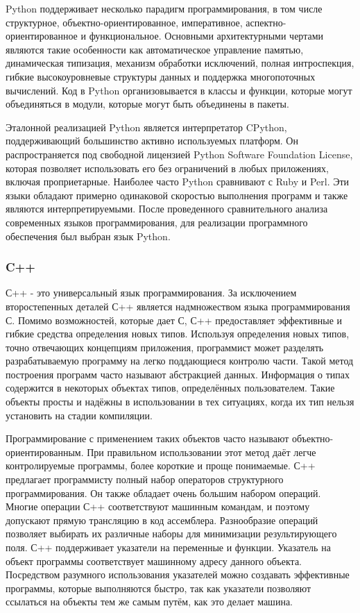 Python поддерживает несколько парадигм программирования, в том числе структурное, объектно-ориентированное, императивное, аспектно-ориентированное и функциональное. 
Основными архитектурными чертами являются такие особенности как автоматическое управление памятью, динамическая
типизация, механизм обработки исключений, полная интроспекция, гибкие высокоуровневые структуры данных и поддержка многопоточных вычислений. 
Код в Python организовывается в классы и функции, которые могут объединяться в модули, которые могут быть объединены в пакеты. 

Эталонной реализацией Python является интерпретатор CPython, поддерживающий большинство активно используемых платформ. Он распространяется под свободной лицензией Python Software Foundation License, которая
позволяет использовать его без ограничений в любых приложениях, включая проприетарные. 
Наиболее часто Python сравнивают с Ruby и Perl. Эти языки обладают примерно одинаковой скоростью выполнения программ и также являются интерпретируемыми.
После проведенного сравнительного анализа современных языков программирования, для реализации программного обеспечения был выбран язык Python.

\subsubsection{C++}
С++ - это универсальный язык программирования. 
За исключением второстепенных деталей С++ является надмножеством языка программирования С. 
Помимо возможностей, которые дает С, С++ предоставляет эффективные и гибкие средства определения новых типов. Используя определения новых типов, точно отвечающих концепциям приложения, программист может разделять разрабатываемую программу на легко поддающиеся контролю части. 
Такой метод построения программ часто называют абстракцией данных.
Информация о типах содержится в некоторых объектах типов, определённых пользователем. 
Такие объекты просты и надёжны в использовании в тех ситуациях, когда их тип нельзя установить на стадии компиляции.

Программирование с применением таких объектов часто называют объектно-ориентированным. 
При правильном использовании этот метод даёт легче контролируемые программы, более короткие и проще понимаемые. 
С++ предлагает программисту полный набор операторов структурного программирования. Он также обладает очень большим набором операций. 
Многие операции С++ соответствуют машинным командам, и поэтому допускают прямую трансляцию в код ассемблера. Разнообразие операций позволяет выбирать их различные наборы для минимизации результирующего поля. 
С++ поддерживает указатели на переменные и функции. 
Указатель на объект программы соответствует машинному адресу данного объекта. 
Посредством разумного использования указателей можно создавать эффективные программы, которые выполняются быстро, так как указатели позволяют ссылаться на объекты тем же самым путём, как это делает машина.

